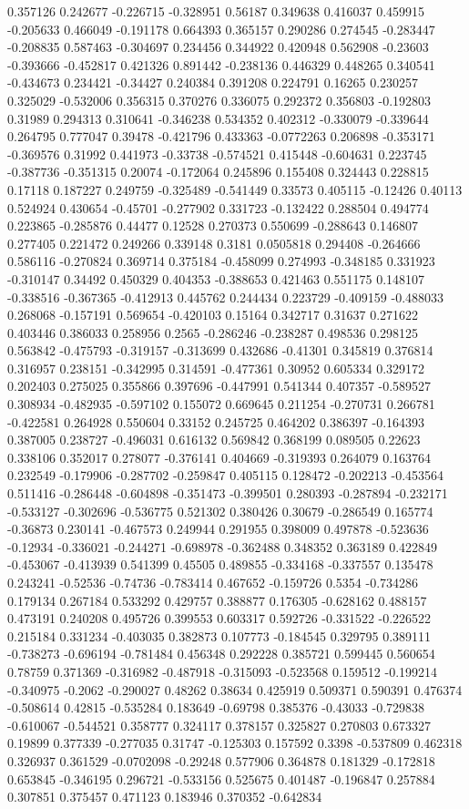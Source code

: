 0.357126 0.242677 -0.226715 -0.328951 0.56187 0.349638 0.416037 0.459915 -0.205633 0.466049 -0.191178 0.664393 0.365157 0.290286 0.274545 -0.283447 -0.208835 0.587463 -0.304697 0.234456 0.344922 0.420948 0.562908 -0.23603 -0.393666 -0.452817 0.421326 0.891442 -0.238136 0.446329 0.448265 0.340541 -0.434673 0.234421 -0.34427 0.240384 0.391208 0.224791 0.16265 0.230257 0.325029 -0.532006 0.356315 0.370276 0.336075 0.292372 0.356803 -0.192803 0.31989 0.294313 0.310641 -0.346238 0.534352 0.402312 -0.330079 -0.339644 0.264795 0.777047 0.39478 -0.421796 0.433363 -0.0772263 0.206898 -0.353171 -0.369576 0.31992 0.441973 -0.33738 -0.574521 0.415448 -0.604631 0.223745 -0.387736 -0.351315 0.20074 -0.172064 0.245896 0.155408 0.324443 0.228815 0.17118 0.187227 0.249759 -0.325489 -0.541449 0.33573 0.405115 -0.12426 0.40113 0.524924 0.430654 -0.45701 -0.277902 0.331723 -0.132422 0.288504 0.494774 0.223865 -0.285876 0.44477 0.12528 0.270373 0.550699 -0.288643 0.146807 0.277405 0.221472 0.249266 0.339148 0.3181 0.0505818 0.294408 -0.264666 0.586116 -0.270824 0.369714 0.375184 -0.458099 0.274993 -0.348185 0.331923 -0.310147 0.34492 0.450329 0.404353 -0.388653 0.421463 0.551175 0.148107 -0.338516 -0.367365 -0.412913 0.445762 0.244434 0.223729 -0.409159 -0.488033 0.268068 -0.157191 0.569654 -0.420103 0.15164 0.342717 0.31637 0.271622 0.403446 0.386033 0.258956 0.2565 -0.286246 -0.238287 0.498536 0.298125 0.563842 -0.475793 -0.319157 -0.313699 0.432686 -0.41301 0.345819 0.376814 0.316957 0.238151 -0.342995 0.314591 -0.477361 0.30952 0.605334 0.329172 0.202403 0.275025 0.355866 0.397696 -0.447991 0.541344 0.407357 -0.589527 0.308934 -0.482935 -0.597102 0.155072 0.669645 0.211254 -0.270731 0.266781 -0.422581 0.264928 0.550604 0.33152 0.245725 0.464202 0.386397 -0.164393 0.387005 0.238727 -0.496031 0.616132 0.569842 0.368199 0.089505 0.22623 0.338106 0.352017 0.278077 -0.376141 0.404669 -0.319393 0.264079 0.163764 0.232549 -0.179906 -0.287702 -0.259847 0.405115 0.128472 -0.202213 -0.453564 0.511416 -0.286448 -0.604898 -0.351473 -0.399501 0.280393 -0.287894 -0.232171 -0.533127 -0.302696 -0.536775 0.521302 0.380426 0.30679 -0.286549 0.165774 -0.36873 0.230141 -0.467573 0.249944 0.291955 0.398009 0.497878 -0.523636 -0.12934 -0.336021 -0.244271 -0.698978 -0.362488 0.348352 0.363189 0.422849 -0.453067 -0.413939 0.541399 0.45505 0.489855 -0.334168 -0.337557 0.135478 0.243241 -0.52536 -0.74736 -0.783414 0.467652 -0.159726 0.5354 -0.734286 0.179134 0.267184 0.533292 0.429757 0.388877 0.176305 -0.628162 0.488157 0.473191 0.240208 0.495726 0.399553 0.603317 0.592726 -0.331522 -0.226522 0.215184 0.331234 -0.403035 0.382873 0.107773 -0.184545 0.329795 0.389111 -0.738273 -0.696194 -0.781484 0.456348 0.292228 0.385721 0.599445 0.560654 0.78759 0.371369 -0.316982 -0.487918 -0.315093 -0.523568 0.159512 -0.199214 -0.340975 -0.2062 -0.290027 0.48262 0.38634 0.425919 0.509371 0.590391 0.476374 -0.508614 0.42815 -0.535284 0.183649 -0.69798 0.385376 -0.43033 -0.729838 -0.610067 -0.544521 0.358777 0.324117 0.378157 0.325827 0.270803 0.673327 0.19899 0.377339 -0.277035 0.31747 -0.125303 0.157592 0.3398 -0.537809 0.462318 0.326937 0.361529 -0.0702098 -0.29248 0.577906 0.364878 0.181329 -0.172818 0.653845 -0.346195 0.296721 -0.533156 0.525675 0.401487 -0.196847 0.257884 0.307851 0.375457 0.471123 0.183946 0.370352 -0.642834 